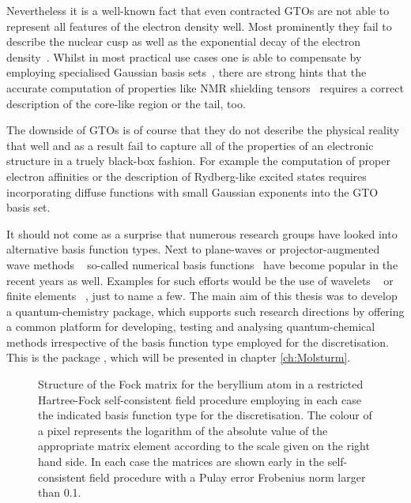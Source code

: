 Nevertheless it is a well-known fact
that even contracted GTOs are not able to represent
all features of the electron density well.
Most prominently they fail to describe the nuclear cusp as well as
the exponential decay of the electron density~\cite{Kato1957}.
Whilst in most practical use cases one is able to compensate
by employing specialised Gaussian basis sets~\cite{Jensen2013,Hill2013},
there are strong hints that the accurate computation of properties
like NMR shielding tensors~\cite{Guell2008,Hoggan2009}
requires a correct description of the core-like region or the tail, too.

The downside of GTOs is of course that they do not describe the physical
reality that well and as a result fail to capture all of the properties
of an electronic structure in a truely black-box fashion.
For example the computation of proper electron affinities or the description
of Rydberg-like excited states requires incorporating diffuse functions
with small Gaussian exponents into the GTO basis set.

It should not come as a surprise that numerous research groups
have looked into alternative basis function types.
Next to plane-waves or projector-augmented wave methods%
~\cite{Kresse1996,Kresse1999,Mortensen2005,Enkovaara2010}
so-called numerical basis functions~\cite{Frediani2015}
have become popular in the recent years as well.
Examples for such efforts would be the use of wavelets%
~\cite{Bischoff2011,Bischoff2012,Bischoff2013,Bischoff2014,Bischoff2014a,Bischoff2017}
or finite elements%
~\cite{Tsuchida1995,Soler2002,Lehtovaara2009,Alizadegan2010,Avery2011PhD,Davydov2015,Boffi2016},
just to name a few.
The main aim of this thesis was to develop a quantum-chemistry
package, which supports such research directions
by offering a common platform for developing, testing and analysing
quantum-chemical methods irrespective of the basis function type employed for
the discretisation.
This is the package \molsturm,
which will be presented in chapter \vref{ch:Molsturm}.

\begin{figure}
	\centering
	\caption{
		Structure of the Fock matrix for the beryllium atom
		in a restricted Hartree-Fock self-consistent field procedure
		employing in each case the indicated basis function type
		for the discretisation.
		The colour of a pixel represents the logarithm
		of the absolute value of the appropriate matrix element
		according to the scale given on the right hand side.
		In each case the matrices are shown early in the self-consistent
		field procedure with a Pulay error Frobenius norm larger than 0.1.
	}
	\label{fig:FockStructure}
\end{figure}

